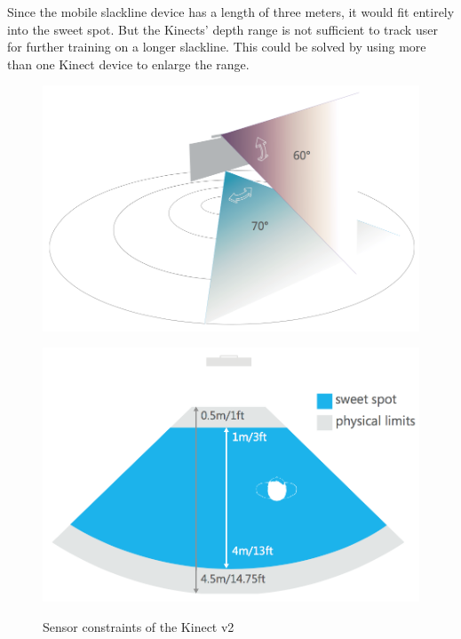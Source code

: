 Since the mobile slackline device has a length of three meters, it would fit entirely into the sweet spot. But the Kinects' depth range is not sufficient to track user for further training on a longer slackline. This could be solved by using more than one Kinect device to enlarge the range. 
\begin{figure}[htb]
	\centering
	\begin{minipage}[t]{0.44\linewidth}
		\centering
		\includegraphics[width=1\linewidth]{Pictures/5_1_1_visionAngle}
		\label{fig:5_1_1_visionAngle}
	\end{minipage}
	\hfill
	\begin{minipage}[t]{0.44\linewidth}
		\centering
		\includegraphics[width=1\linewidth]{Pictures/5_1_1_trackingRange}
		\label{fig:5_1_1_trackingRange}
	\end{minipage}
	\caption{Sensor constraints of the Kinect v2~\cite{MicrosoftHIG2014-mh}}
	\label{fig:5_1_1_sensorConstraints}
\end{figure}

